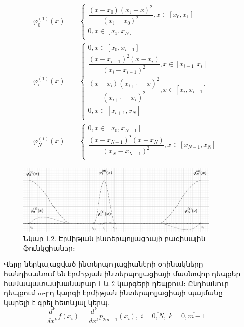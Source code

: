 \documentclass[fleqn, bachelor,subf,12pt,notitlepage]{article}
\begin{document}
\begin{equation}
\begin{aligned}
\varphi^{(1)}_{0}\left(x\right)&=\begin{cases}
\dfrac{\left(x-x_{0}\right)\left(x_{1}-x\right)^{2}}{\left(x_{1}-x_{0}\right)^{2}}, x\in \left[x_{0}, x_{1}\right]\\
0, x\in \left[x_{1}, x_{N}\right]\\
\end{cases}\\
\varphi^{(1)}_{i}\left(x\right)&=\begin{cases}
0, x\in \left[x_{0}, x_{i-1}\right]\\
\dfrac{\left(x-x_{i-1}\right)^2\left(x-x_{i}\right)}{\left(x_{i}-x_{i-1}\right)^{2}}, x\in \left[x_{i-1}, x_{i}\right]\\
\dfrac{\left(x-x_{i}\right)\left(x_{i+1}-x\right)^{2}}{\left(x_{i+1}-x_{i}\right)^{2}}, x\in \left[x_{i}, x_{i+1}\right]\\
0, x\in \left[x_{i+1}, x_{N}\right]\\
\end{cases}\\
\varphi^{(1)}_{N}\left(x\right)&=\begin{cases}
0, x\in \left[x_{0}, x_{N-1}\right]\\
\dfrac{\left(x-x_{N-1}\right)^{2}\left(x-x_{N}\right)}{\left(x_{N}-x_{N-1}\right)^{2}}, x\in \left[x_{N-1}, x_{N}\right]\\
\end{cases}
\end{aligned}
\end{equation}


\begin{figure}[h]
\centering
\includegraphics[width=0.9\textwidth]{images/one_var_quadratic}
\captionsetup{labelformat=empty}
\caption{\hfill Նկար 1.2. Էրմիթյան ինտերպոլյացիայի բազիսային ֆունկցիաներ։}
\end{figure}
Վերը ներկայացված ինտերպոլյացիաների օրինակները հանդիսանում են էրմիթյան ինտերպոլյացիայի մասնովոր դեպքեր համապատասխանաբար 1 և 2 կարգերի դեպքում։
Ընդհանուր դեպքում m֊րդ կարգի էրմիթյան ինտերպոլյացիայի պայմանը կարելի է գրել հետևյալ կերպ.
\begin{equation}
\dfrac{d^{k}}{dx^{k}}f\left(x_{i}\right)=\dfrac{d^{k}}{dx^{k}}p_{2m-1}\left(x_{i}\right), \;  i=\overline{0, N}, \;  k=\overline{0, m-1}
\end{equation}
\newpage
\end{document}
